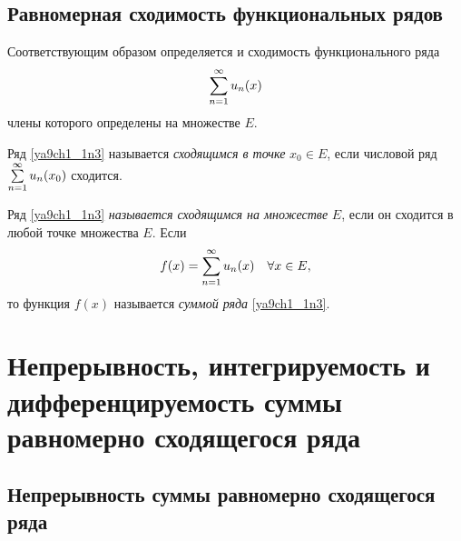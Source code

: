 \subsection{Равномерная сходимость функциональных рядов}

Соответствующим образом определяется и сходимость функционального ряда
\begin{equation} \label{ya9ch1_1n3}
\sum_{n=1}^{\infty}\limits u_n(x)
\end{equation}
члены которого определены на множестве $E$.
\begin{defn} Ряд \eqref{ya9ch1_1n3} называется \textit{сходящимся в точке} $x_0 \in E$, если числовой ряд $\sum_{n=1}^{\infty}\limits u_n(x_0)$ сходится.

Ряд \eqref{ya9ch1_1n3} \textit{называется сходящимся на множестве} $E$, если он сходится в любой точке множества $E$. Если
\begin{equation} \label{ya9ch1_1n4}
f(x)=\sum_{n=1}^{\infty}\limits u_n(x) \quad\forall x \in E,
\end{equation}
то функция $f(x)$ называется \textit{суммой ряда} \eqref{ya9ch1_1n3}.
\end{defn}

\section{Непрерывность, интегрируемость и дифференцируемость суммы равномерно сходящегося ряда}

\subsection{Непрерывность суммы равномерно сходящегося ряда}

